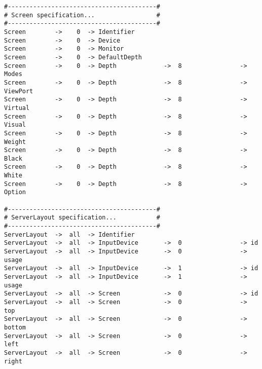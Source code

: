\begin{verbatim}
#-----------------------------------------#
# Screen specification...                 #
#-----------------------------------------#
Screen        ->    0  -> Identifier
Screen        ->    0  -> Device
Screen        ->    0  -> Monitor
Screen        ->    0  -> DefaultDepth
Screen        ->    0  -> Depth             ->  8                -> Modes
Screen        ->    0  -> Depth             ->  8                -> ViewPort
Screen        ->    0  -> Depth             ->  8                -> Virtual
Screen        ->    0  -> Depth             ->  8                -> Visual
Screen        ->    0  -> Depth             ->  8                -> Weight
Screen        ->    0  -> Depth             ->  8                -> Black
Screen        ->    0  -> Depth             ->  8                -> White
Screen        ->    0  -> Depth             ->  8                -> Option

#-----------------------------------------#
# ServerLayout specification...           #
#-----------------------------------------#
ServerLayout  ->  all  -> Identifier
ServerLayout  ->  all  -> InputDevice       ->  0                -> id
ServerLayout  ->  all  -> InputDevice       ->  0                -> usage
ServerLayout  ->  all  -> InputDevice       ->  1                -> id
ServerLayout  ->  all  -> InputDevice       ->  1                -> usage
ServerLayout  ->  all  -> Screen            ->  0                -> id
ServerLayout  ->  all  -> Screen            ->  0                -> top
ServerLayout  ->  all  -> Screen            ->  0                -> bottom
ServerLayout  ->  all  -> Screen            ->  0                -> left
ServerLayout  ->  all  -> Screen            ->  0                -> right
\end{verbatim} 


